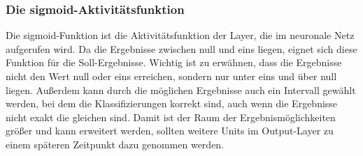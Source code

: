 \subsubsection{Die sigmoid-Aktivitätsfunktion}
\label{sec:inp}
Die sigmoid-Funktion ist die Aktivitätsfunktion der Layer, die im neuronale Netz aufgerufen wird. Da die Ergebnisse zwischen null und eins liegen, eignet sich diese Funktion für die Soll-Ergebnisse. \citep{Rey2011} Wichtig ist zu erwähnen, dass die Ergebnisse nicht den Wert null oder eins erreichen, sondern nur unter eins und über null liegen. Außerdem kann durch die möglichen Ergebnisse auch ein Intervall gewählt werden, bei dem die Klassifizierungen korrekt sind, auch wenn die Ergebnisse nicht exakt die gleichen sind. Damit ist der Raum der Ergebnismöglichkeiten größer und kann erweitert werden, sollten weitere Units im Output-Layer zu einem späteren Zeitpunkt dazu genommen werden.
\newline
\newline
{}

